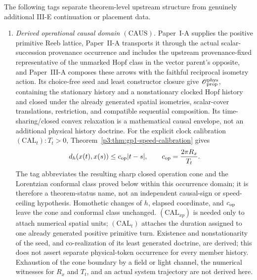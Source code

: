 \documentclass[12pt,a4paper]{article}
\begin{document}
\begin{definition}
\label{p3:def:causal-wick-response-hypotheses}
The following tags separate theorem-level upstream structure from genuinely
additional III-E continuation or placement data.
\begin{enumerate}[label=(\roman*)]
\item \emph{Derived operational causal domain \((\mathrm{CAUS})\).}
Paper~I-A supplies the positive primitive Reeb lattice, Paper~II-A transports
it through the actual scalar-succession provenance occurrence and includes
the upstream provenance-fixed representative of the unmarked Hopf class in the vector parent's opposite, and Paper~III-A
composes these arrows with the faithful reciprocal isometry action.  Its
choice-free seed and least constructor closure give
\(\mathscr O_{\rm prop}^{\rm phys}\), containing the stationary history and a
nonstationary clocked Hopf history and closed under the already generated
spatial isometries, scalar-cover translations, restriction, and compatible
sequential composition.  Its time-sharing/closed convex relaxation is a
mathematical causal envelope, not an additional physical history doctrine.
For the explicit clock calibration
\((\mathrm{CAL}_t):T_t>0\),
Theorem~\ref{p3:thm:gp1-speed-calibration} gives
\[
 d_h(x(t),x(s))\le c_{\rm op}|t-s|,
 \qquad c_{\rm op}=\frac{2\pi R_x}{T_t}.
\]
The tag abbreviates the resulting sharp closed operation cone and the
Lorentzian conformal class proved below within this occurrence domain; it is
therefore a theorem-status name, not an independent causal-sign or
speed-ceiling hypothesis.  Homothetic changes of \(h\), elapsed coordinate,
and \(c_{\rm op}\) leave the cone and conformal class unchanged.
\((\mathrm{CAL}_{xp})\) is needed only to attach numerical spatial units;
\((\mathrm{CAL}_t)\) attaches the duration assigned to one already generated
positive primitive turn.  Existence and nonstationarity of the seed, and co-realization
of its least generated doctrine, are derived; this does not assert separate
physical-token occurrence for every member history.  Exhaustion of the cone
boundary by a field or light channel, the numerical witnesses for \(R_x\) and
\(T_t\), and an actual system trajectory are not derived here.


\end{enumerate}
\end{definition}
\end{document}
